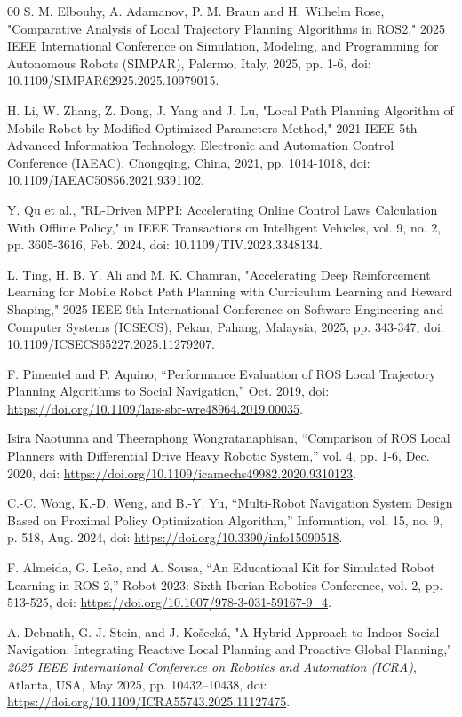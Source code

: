 \documentclass[conference]{IEEEtran}
\begin{document}
\newpage
\begin{thebibliography}{00}
 S. M. Elbouhy, A. Adamanov, P. M. Braun and H. Wilhelm Rose, "Comparative Analysis of Local Trajectory Planning Algorithms in ROS2," 2025 IEEE International Conference on Simulation, Modeling, and Programming for Autonomous Robots (SIMPAR), Palermo, Italy, 2025, pp. 1-6, doi: 10.1109/SIMPAR62925.2025.10979015.

 H. Li, W. Zhang, Z. Dong, J. Yang and J. Lu, "Local Path Planning Algorithm of Mobile Robot by Modified Optimized Parameters Method," 2021 IEEE 5th Advanced Information Technology, Electronic and Automation Control Conference (IAEAC), Chongqing, China, 2021, pp. 1014-1018, doi: 10.1109/IAEAC50856.2021.9391102.

 Y. Qu et al., "RL-Driven MPPI: Accelerating Online Control Laws Calculation With Offline Policy," in IEEE Transactions on Intelligent Vehicles, vol. 9, no. 2, pp. 3605-3616, Feb. 2024, doi: 10.1109/TIV.2023.3348134.

 L. Ting, H. B. Y. Ali and M. K. Chamran, "Accelerating Deep Reinforcement Learning for Mobile Robot Path Planning with Curriculum Learning and Reward Shaping," 2025 IEEE 9th International Conference on Software Engineering and Computer Systems (ICSECS), Pekan, Pahang, Malaysia, 2025, pp. 343-347, doi: 10.1109/ICSECS65227.2025.11279207.

 F. Pimentel and P. Aquino, “Performance Evaluation of ROS Local Trajectory Planning Algorithms to Social Navigation,” Oct. 2019, doi: \url{https://doi.org/10.1109/lars-sbr-wre48964.2019.00035}.

 Isira Naotunna and Theeraphong Wongratanaphisan, “Comparison of ROS Local Planners with Differential Drive Heavy Robotic System,” vol. 4, pp. 1-6, Dec. 2020, doi: \url{https://doi.org/10.1109/icamechs49982.2020.9310123}.

 C.-C. Wong, K.-D. Weng, and B.-Y. Yu, “Multi-Robot Navigation System Design Based on Proximal Policy Optimization Algorithm,” Information, vol. 15, no. 9, p. 518, Aug. 2024, doi: \url{https://doi.org/10.3390/info15090518}.

 F. Almeida, G. Le\~{a}o, and A. Sousa, “An Educational Kit for Simulated Robot Learning in ROS 2,” Robot 2023: Sixth Iberian Robotics Conference, vol. 2, pp. 513-525, doi: \url{https://doi.org/10.1007/978-3-031-59167-9_4}.

 A. Debnath, G. J. Stein, and J. Ko\v{s}eck\'{a}, "A Hybrid Approach to Indoor Social Navigation: Integrating Reactive Local Planning and Proactive Global Planning," \textit{2025 IEEE International Conference on Robotics and Automation (ICRA)}, Atlanta, USA, May 2025, pp. 10432--10438, doi: \url{https://doi.org/10.1109/ICRA55743.2025.11127475}.


\end{thebibliography}
\end{document}

